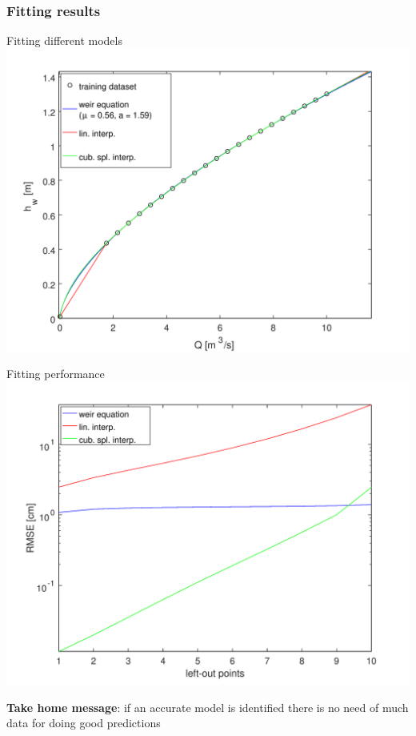 \documentclass[xcolor=dvipsnames, USenglish]{beamer}  %
\begin{document}
  \begin{frame}
    \frametitle{Fitting results}
    \begin{minipage}{.5\textwidth}
      \centering
      \small{Fitting different models}\\
      \includegraphics[width=\textwidth]{img/fitting_results.png}
    \end{minipage}%
    \begin{minipage}{.5\textwidth}
      \centering
      \small{Fitting performance}\\
      \includegraphics[width=\textwidth]{img/fitting_errors.png}
    \end{minipage}
    \vfill
    \pause
    \small{\textbf{Take home message}: if an accurate model is identified there is no need of much data for doing good predictions}
  \end{frame}
\end{document}
